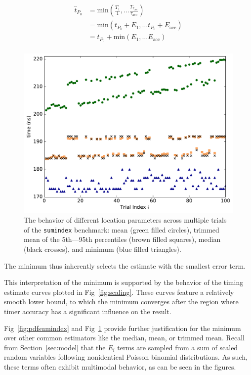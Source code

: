 \documentclass[conference]{IEEEtran}
\begin{document}
\begin{align}
    \hat{t}_{P_0} &= \textrm{min}(\frac{T_1}{1}, \dots \frac{T_{\tau_{\textrm{acc}}}}{\tau_{\textrm{acc}}}) \\ \nonumber
                  &= \textrm{min}(t_{P_0} + E_1, \dots t_{P_0} + E_{\textrm{acc}}) \\ \nonumber
                  &= t_{P_0} + \textrm{min}(E_1, \dots E_{\textrm{acc}}) \\ \nonumber
\end{align}

\begin{figure}
\centering
\includegraphics[width=\columnwidth]{figures/fig3/location_estimators_sumindex}
\caption{The behavior of different location parameters across multiple trials of
the \lstinline|sumindex| benchmark: mean (green filled circles), trimmed mean of
the 5th---95th percentiles (brown filled squares), median (black crosses), and
minimum (blue filled triangles).}
\label{fig:locationmeasures}
\end{figure}

The minimum thus inherently selects the estimate with the smallest error term.

This interpretation of the minimum is supported by the behavior of the timing estimate
curves plotted in Fig~\ref{fig:scaling}. These curves feature a relatively smooth lower
bound, to which the minimum converges after the region where timer accuracy has a
significant influence on the result.

Fig~\ref{fig:pdfsumindex} and Fig~\ref{fig:locationmeasures} provide further justification
for the minimum over other common estimators like the median, mean, or trimmed mean. Recall
from Section~\ref{sec:model} that the $E_i$ terms are sampled from a sum of scaled random
variables following nonidentical Poisson binomial distributions. As such, these terms often
exhibit multimodal behavior, as can be seen in the figures.
\end{document}
